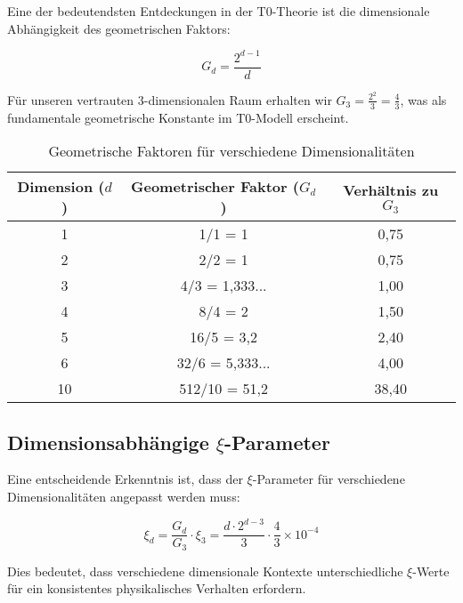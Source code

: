 \documentclass[12pt,a4paper]{article}
\newcommand{\xipar}{\ensuremath{\xi}}
\newcommand{\mytimes}{\ensuremath{\times}}
\begin{document}
	Eine der bedeutendsten Entdeckungen in der T0-Theorie ist die dimensionale Abhängigkeit des geometrischen Faktors:
	
	\begin{equation}
		G_d = \frac{2^{d-1}}{d}
	\end{equation}
	
	Für unseren vertrauten 3-dimensionalen Raum erhalten wir $G_3 = \frac{2^2}{3} = \frac{4}{3}$, was als fundamentale geometrische Konstante im T0-Modell erscheint.
	
	\begin{table}[htbp]
		\centering
		\begin{tabular}{ccc}
			\toprule
			\textbf{Dimension ($d$)} & \textbf{Geometrischer Faktor ($G_d$)} & \textbf{Verhältnis zu $G_3$} \\
			\midrule
			1 & 1/1 = 1 & 0,75 \\
			2 & 2/2 = 1 & 0,75 \\
			3 & 4/3 = 1,333... & 1,00 \\
			4 & 8/4 = 2 & 1,50 \\
			5 & 16/5 = 3,2 & 2,40 \\
			6 & 32/6 = 5,333... & 4,00 \\
			10 & 512/10 = 51,2 & 38,40 \\
			\bottomrule
		\end{tabular}
		\caption{Geometrische Faktoren für verschiedene Dimensionalitäten}
		\label{tab:geometric_factors}
	\end{table}
	
	\subsection{Dimensionsabhängige $\xi$-Parameter}
	\label{subsec:dimension_dependent_xi}
	
	Eine entscheidende Erkenntnis ist, dass der $\xipar$-Parameter für verschiedene Dimensionalitäten angepasst werden muss:
	
	\begin{equation}
		\xipar_d = \frac{G_d}{G_3} \cdot \xipar_3 = \frac{d \cdot 2^{d-3}}{3} \cdot \frac{4}{3} \mytimes 10^{-4}
	\end{equation}
	
	Dies bedeutet, dass verschiedene dimensionale Kontexte unterschiedliche $\xipar$-Werte für ein konsistentes physikalisches Verhalten erfordern.
	
\end{document}
